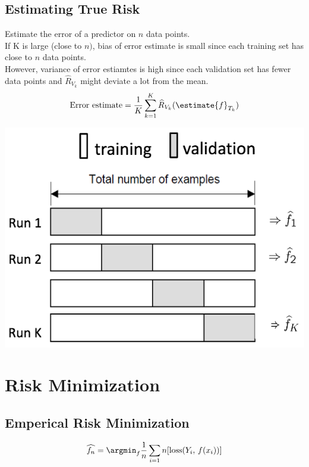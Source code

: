 \documentclass[18pt,a3paper,landscape, ncols=3]{cheatsheet}
\begin{document}
		\subsection{Estimating True Risk}
			\begin{mdframed}
				\begin{minipage}{.5\textwidth}
					Estimate the error of a predictor on \(n\) data points.\\
					If K is large (close to \(n)\), bias of error estimate is small since each training set has close to \(n\) data points.\\
					However, variance of error estiamtes is high since each validation set has fewer data points and \(\widehat{R}_{V_{k}}\) might deviate a lot from the mean.\\
					\[
						\text{Error estimate} = \frac{1}{K} \sum_{k=1}^{K} \widehat{R}_{V_{k}} (\estimate{f}_{T_{k}})
					\]
				\end{minipage}%
				\begin{minipage}{.5\textwidth}
					\includegraphics{estimating_true_risk.png}
				\end{minipage}
			\end{mdframed}

\section{Risk Minimization} \seperator
	\subsection{Emperical Risk Minimization}
		\begin{mdframed}
			\[
				\widehat{f_n} = \argmin_{f} \frac{1}{n} \sum_{i=1}{n} [\mathrm{loss}(Y_i,\, f(x_i))]
			\]
		\end{mdframed}
\end{document}
